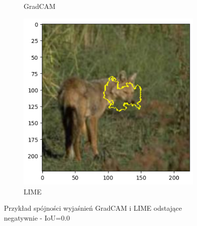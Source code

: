 \begin{figure}[h]
\begin{subfigure}[b]{0.3\textwidth}
		\caption{GradCAM}  \label{}
	\end{subfigure}
	\begin{subfigure}[b]{0.3\textwidth}
		\centering\includegraphics[width=.9\textwidth]{img/examples/appendix/n02114712_40677_lime}
		\caption{LIME}
	\end{subfigure}
	\caption{Przykład spójności wyjaśnień GradCAM i LIME odstające negatywnie - IoU=0.0}
	\label{}
\end{figure}
